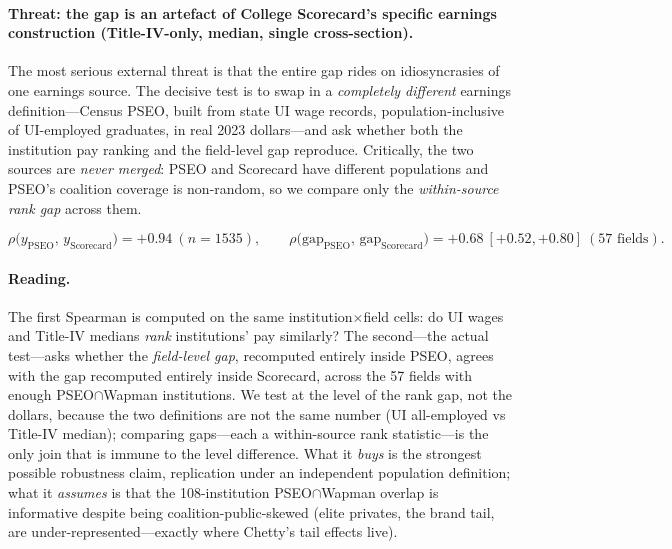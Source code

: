 \documentclass[11pt]{article}
\begin{document}
\paragraph{Threat: the gap is an artefact of College Scorecard's specific earnings construction (Title-IV-only, median, single cross-section).}
The most serious external threat is that the entire gap rides on idiosyncrasies of one earnings source. The decisive test is to swap in a \emph{completely different} earnings definition---Census PSEO, built from state UI wage records, population-inclusive of UI-employed graduates, in real 2023 dollars---and ask whether both the institution pay ranking and the field-level gap reproduce. Critically, the two sources are \emph{never merged}: PSEO and Scorecard have different populations and PSEO's coalition coverage is non-random, so we compare only the \emph{within-source rank gap} across them.

\[
\rho\bigl(y_{\text{PSEO}},\,y_{\text{Scorecard}}\bigr)=+0.94\ (n=1535),\qquad
\rho\bigl(\text{gap}_{\text{PSEO}},\,\text{gap}_{\text{Scorecard}}\bigr)=+0.68\ [+0.52,+0.80]\ (57\text{ fields}).
\]

\paragraph{Reading.} The first Spearman is computed on the same institution$\times$field cells: do UI wages and Title-IV medians \emph{rank} institutions' pay similarly? The second---the actual test---asks whether the \emph{field-level gap}, recomputed entirely inside PSEO, agrees with the gap recomputed entirely inside Scorecard, across the 57 fields with enough PSEO$\cap$Wapman institutions. We test at the level of the rank gap, not the dollars, because the two definitions are not the same number (UI all-employed vs Title-IV median); comparing gaps---each a within-source rank statistic---is the only join that is immune to the level difference. What it \emph{buys} is the strongest possible robustness claim, replication under an independent population definition; what it \emph{assumes} is that the 108-institution PSEO$\cap$Wapman overlap is informative despite being coalition-public-skewed (elite privates, the brand tail, are under-represented---exactly where Chetty's tail effects live).
\end{document}
